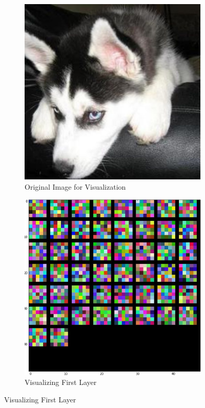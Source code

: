 \begin{figure}[H]
  \centering
  \begin{subfigure}{0.45\textwidth}
    \includegraphics[width=0.9\linewidth]{img/training4.jpg}
    \caption{Original Image for Visualization}
  \end{subfigure}%
  \hfill
  \begin{subfigure}{0.45\textwidth}
    \includegraphics[width=.9\linewidth]{img/Training2.jpg}
    \caption{Visualizing First Layer}
  \end{subfigure}

  \label{fig:UI}
\end{figure}

